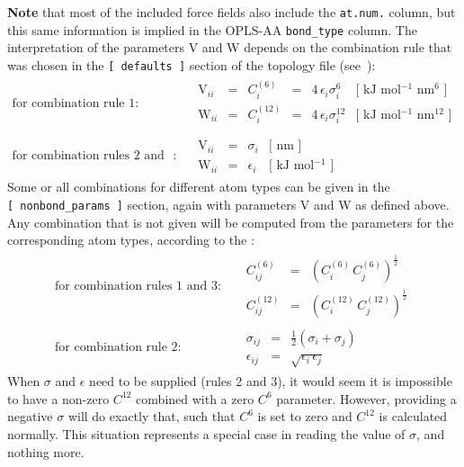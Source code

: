 {\bf Note} that most of the included force fields also include the {\tt at.num.} column, 
but this same information is implied in the OPLS-AA {\tt bond_type} column.
The interpretation of the parameters V and W depends on the combination rule 
that was chosen in the {\tt [~defaults~]} section of the topology file 
(see~):
\begin{eqnarray}
\mbox{for combination rule 1}: & &
\begin{array}{llllll}
  \mbox{V}_{ii} & = & C^{(6)}_{i}  & = & 4\,\epsilon_i\sigma_i^{6} &
  \mbox{[ kJ mol$^{-1}$ nm$^{6}$ ]}\\
  \mbox{W}_{ii} & = & C^{(12)}_{i} & = & 4\,\epsilon_i\sigma_i^{12} &
  \mbox{[ kJ mol$^{-1}$ nm$^{12}$ ]}\\
\end{array}
\\
\mbox{for combination rules 2 and 3}: & &
\begin{array}{llll}
  \mbox{V}_{ii} & = & \sigma_i   & \mbox{[ nm ]} \\
  \mbox{W}_{ii} & = & \epsilon_i & \mbox{[ kJ mol$^{-1}$ ]}
\end{array}
\end{eqnarray}
Some or all combinations for different atom types can be given in the 
{\tt [~nonbond_params~]} section, again with parameters V and W as defined 
above. Any combination that is not given will be computed from the parameters 
for the corresponding atom types, according to the :
\begin{eqnarray}
\mbox{for combination rules 1 and 3}: & &
\begin{array}{lll}
  C^{(6)}_{ij}  & = & \left(C^{(6)}_i\,C^{(6)}_j\right)^{\frac{1}{2}} \\
  C^{(12)}_{ij} & = & \left(C^{(12)}_i\,C^{(12)}_j\right)^{\frac{1}{2}}
\end{array}
\\
\mbox{for combination rule 2}: & &
\begin{array}{lll}
  \sigma_{ij}   & = & \frac{1}{2}(\sigma_i+\sigma_j) \\
  \epsilon_{ij} & = & \sqrt{\epsilon_i\,\epsilon_j}
\end{array}
\end{eqnarray}
When $\sigma$ and $\epsilon$ need to be supplied (rules 2 and 3),
it would seem it is impossible to have a non-zero $C^{12}$ combined
with a zero $C^6$ parameter. However, providing a negative $\sigma$
will do exactly that, such that $C^6$ is set to zero and $C^{12}$ is
calculated normally. This situation represents a special case in reading
the value of $\sigma$, and nothing more.

